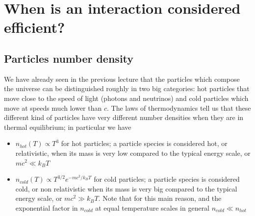\documentclass[11pt, a4paper,oneside,openright]{book}
\numberwithin{equation}{section}
\begin{document}
\section{When is an interaction considered efficient?}
\subsection{Particles number density}
\label{densities}
We have already seen in the previous lecture that the particles which compose the universe can be distinguished roughly in two big categories: hot particles that move close to the speed of light (photons and neutrinos) and cold particles which move at speeds much lower than $c$. The laws of thermodynamics tell us that these different kind of particles have very different number densities when they are in thermal equilibrium; in particular we have
\begin{itemize}
\item $n_{hot}(T)\propto T^3$ for hot particles; a particle species is considered hot, or relativistic, when its mass is very low compared to the typical energy scale, or $mc^2\ll k_BT$
\item $n_{cold}(T)\propto T^{3/2}e^{-mc^2/k_BT}$ for cold particles; a particle species is considered cold, or non relativistic when its mass is very big compared to the typical energy scale, or $mc^2\gg k_BT$. Note that for this main reason, and the exponential factor in $n_{cold}$ at equal temperature scales in general $n_{cold}\ll n_{hot}$
\end{itemize} 
\end{document}
